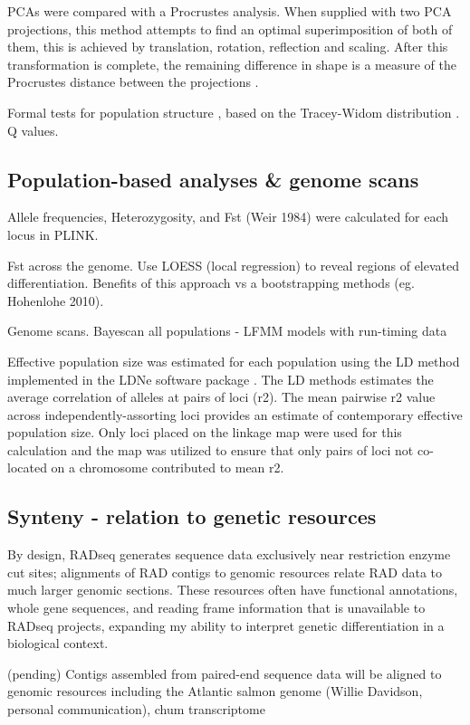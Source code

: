 \documentclass[12pt, one column]{article}
\begin{document}
PCAs were compared with a Procrustes analysis. When supplied with two PCA projections, this method attempts to find an optimal superimposition of both of them, this is achieved by  translation, rotation, reflection and scaling.  After this transformation is complete, the remaining difference in shape is a measure of the Procrustes distance between the projections \citep{Peres2001}.

Formal tests for population structure \citep{Patterson2006}, based on the Tracey-Widom distribution \citep{Tracy1994}. Q values.

\subsection*{Population-based analyses \& genome scans}
Allele frequencies, Heterozygosity, and Fst (Weir 1984) were calculated for each locus in PLINK.

Fst across the genome.  Use LOESS (local regression) to reveal regions of elevated differentiation.  Benefits of this approach vs a bootstrapping methods (eg. Hohenlohe 2010).

Genome scans.  Bayescan all populations - 
LFMM models with run-timing data

Effective population size was estimated for each population using the LD method implemented in the LDNe software package \citep{Waples2010}.  The LD methods estimates the average correlation of alleles at pairs of loci (r2). The mean pairwise r2 value across independently-assorting loci provides an estimate of contemporary effective population size. Only loci placed on the linkage map were used for this calculation and the map was utilized to ensure that only pairs of loci not co-located on a chromosome contributed to mean r2.

\subsection*{Synteny - relation to genetic resources}
By design, RADseq generates sequence data exclusively near restriction enzyme cut sites; alignments of RAD contigs to genomic resources relate RAD data to much larger genomic sections.  These resources often have functional annotations, whole gene sequences, and reading frame information that is unavailable to RADseq projects, expanding my ability to interpret genetic differentiation in a biological context.

(pending)
Contigs assembled from paired-end sequence data \citet{Waples2015} will be aligned to genomic resources including the Atlantic salmon genome (Willie Davidson, personal communication), chum transcriptome \citep{Seeb2011}
\end{document}
